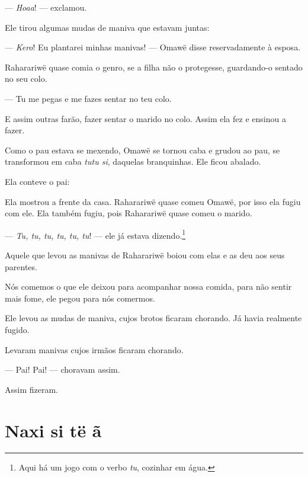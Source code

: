 
--- \textit{Hoaa}! --- exclamou. 

Ele tirou algumas mudas de maniva que estavam juntas:

--- \textit{Kero}! Eu plantarei minhas manivas! --- Omawë disse reservadamente à esposa. 

Raharariwë quase comia o genro, se a filha não o protegesse,
guardando-o sentado no seu colo. 

--- Tu me pegas e me fazes sentar no teu colo. 

E assim outras farão, fazer sentar o marido no colo. Assim ela fez e
ensinou a fazer. 


Como o pau estava se mexendo, Omawë se tornou caba e grudou ao pau, se
transformou em caba \textit{tutu si}, daquelas branquinhas. Ele ficou
abalado. 

Ela conteve o pai: 


Ela mostrou a frente da casa. Raharariwë quase comeu Omawë, por isso ela
fugiu com ele. Ela também fugiu, pois Raharariwë quase comeu o marido. 

--- \textit{Tu, tu, tu, tu, tu, tu}! --- ele já estava dizendo.\footnote{Aqui há um jogo com o verbo \textit{tu}, cozinhar em água.}

Aquele que levou as manivas de Raharariwë boiou com elas e as deu aos
seus parentes. 

Nós comemos o que ele deixou para acompanhar nossa comida, para não
sentir mais fome, ele pegou para nós comermos. 

Ele levou as mudas de maniva, cujos brotos ficaram chorando. Já havia
realmente fugido. 

Levaram manivas cujos irmãos ficaram chorando. 

--- Pai! Pai! --- choravam assim. 

Assim fizeram.

\chapter{Naxi si të ã}

